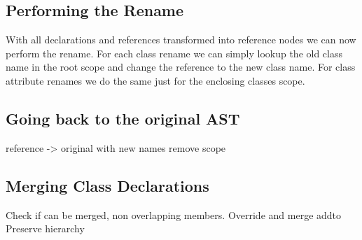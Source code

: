 
\subsection{Performing the Rename}\label{subsec:performing-the-rename}

With all declarations and references transformed into reference nodes we can now perform the rename.
For each class rename we can simply lookup the old class name in the root scope and change the reference to the new class name.
For class attribute renames we do the same just for the enclosing classes scope.

\subsection{Going back to the original AST}\label{subsec:going-back-to-the-original-ast}

reference -> original with new names
remove scope

\subsection{Merging Class Declarations}\label{subsec:merging-class-declarations}

Check if can be merged, non overlapping members.
Override and merge addto
Preserve hierarchy